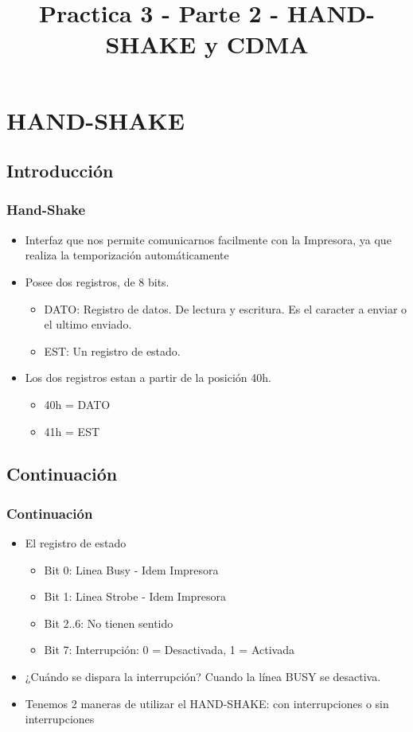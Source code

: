 \documentclass{beamer}
\title{Practica 3 - Parte 2 - HAND-SHAKE y CDMA}
\begin{document}
\begin{frame}
\titlepage
\end{frame}

\section{HAND-SHAKE}
\subsection{Introducción}
\begin{frame}
\frametitle{Hand-Shake}
\begin{itemize}
 \item Interfaz que nos permite comunicarnos facilmente con la Impresora, ya que realiza la temporización automáticamente
 \item Posee dos registros, de 8 bits.
  \begin{itemize}
   \item DATO: Registro de datos. De lectura y escritura. Es el caracter a enviar o el ultimo enviado.
   \item EST: Un registro de estado.
  \end{itemize}
 \item Los dos registros estan a partir de la posición 40h. 
  \begin{itemize}
      \item 40h = DATO
      \item 41h = EST
\end{itemize}
\end{itemize}
\end{frame}

\subsection{Continuación}
\begin{frame}
\frametitle{Continuación}
\begin{itemize}
 \item El registro de estado 
 \begin{itemize}
   \item Bit 0: Linea Busy - Idem Impresora
   \item Bit 1: Linea Strobe - Idem Impresora
   \item Bit 2..6: No tienen sentido
   \item Bit 7: Interrupción: 0 = Desactivada, 1 = Activada
  \end{itemize}
 \item ¿Cuándo se dispara la interrupción? Cuando la línea BUSY se desactiva.
 \item Tenemos 2 maneras de utilizar el HAND-SHAKE: con interrupciones o sin interrupciones
\end{itemize}
\end{frame}
\end{document}
